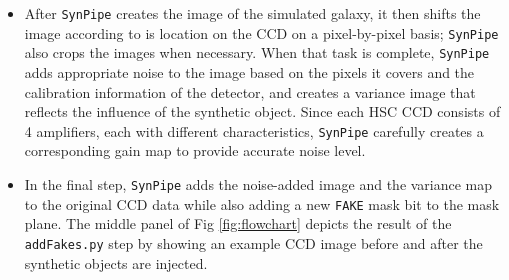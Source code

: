 \documentclass[useamsfonts]{pasj01}
\def\ser{{S\'{e}rsic\ }}
\def\synpipe{\texttt{SynPipe}}
\def\galsim{\texttt{G}{\scriptsize \texttt{AL}}\texttt{S}{\scriptsize \texttt{IM}}}
\begin{document}
\begin{itemize}
\begin{itemize}
            \item For a double-\ser{} model, \synpipe{} uses the \galsim{}\texttt{.Add}
                method to combine two \ser{} components. 
            
            \item For parametric models from the GREAT3 catalog, \synpipe{} uses the
                \texttt{COSMOSCatalog.makeGalaxy} method to generate models.  
                
            \item To inject real HST galaxy images, \synpipe{} calls the \galsim{}    
                \texttt{.RealGalaxy} method.
            
            \end{itemize}

        If necessary, an additional shear ($g_1$ and $g_2$) can be applied to the 
        model at this point.
        Then, \synpipe{} passes the reconstructed PSF image into a
        \galsim{}\texttt{InterpolatedImage} object and convolves it with the galaxy 
        model using \galsim{}\texttt{.Convolve}.
        After this, \synpipe{} uses the \galsim{}\texttt{.drawImage} method to create 
        the image of the simulated galaxy.
        A component with a high \ser{} index ($n_{\mathrm{Ser}} > 4$) often requires 
        a large image size to cover all of its flux, so \synpipe{} allows the user 
        to truncate the model at a given radius (N$\times R_{\mathrm{e}}$).
        \synpipe{} will also give warning information when a component with $
        n_{\mathrm{Ser}} > 6$ is encountered because it takes much longer to achieve
        accurate PSF convolution in such a model; and the result is, therefore,
        not a realistic galaxy model.
        
        \item After \synpipe{} creates the image of the simulated galaxy, it then 
            shifts the image according to is location on the CCD on a pixel-by-pixel 
            basis; \synpipe{} also crops the images when necessary.
            When that task is complete, \synpipe{} adds appropriate noise to the 
            image based on the pixels it covers and the calibration information of 
            the detector, and creates a variance image that reflects the influence 
            of the synthetic object.
            Since each HSC CCD consists of 4 amplifiers, each with different 
            characteristics, \synpipe{} carefully creates a corresponding gain map 
            to provide accurate noise level.
            
        \item In the final step, \synpipe{} adds the noise-added image and the 
            variance map to the original CCD data while also adding a new 
            \texttt{FAKE} mask bit to the mask plane.
            The middle panel of Fig \ref{fig:flowchart} depicts the result of the
            \texttt{addFakes.py} step by showing an example CCD image before and 
            after the synthetic objects are injected.
    
    \end{itemize}
\end{document}
